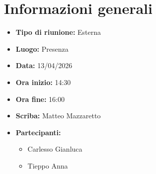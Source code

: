 \section{Informazioni generali}

\begin{itemize} 
    \item \textbf{Tipo di riunione:} Esterna
    \item \textbf{Luogo:} Presenza 
    \item \textbf{Data:} 13/04/2026
    \item \textbf{Ora inizio:} 14:30
    \item \textbf{Ora fine:} 16:00
    \item \textbf{Scriba:} Matteo Mazzaretto 
    \item \textbf{Partecipanti:}
    \begin{itemize}[itemsep=0pt, parsep=1pt, label=--]
        \item Carlesso Gianluca
        \item Tieppo Anna
    \end{itemize}
\end{itemize}